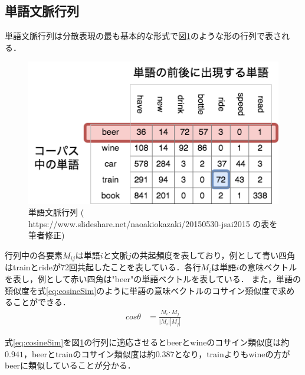 \subsection{単語文脈行列}
\label{rel:wordEmbed:WordParagraphMat}
単語文脈行列は分散表現の最も基本的な形式で図\ref{Fig:WordParagraphMat}のような形の行列で表される．
\begin{figure}[htbp]
 \begin{center}
  \includegraphics[width=\textwidth]{../images/2.Related_Work/WordParagraphMatrix2.png}
  \caption{単語文脈行列\newline
  ( https://www.slideshare.net/naoakiokazaki/20150530-jsai2015 の表を筆者修正)}
  \label{Fig:WordParagraphMat}
  \vspace{-10pt}
 \end{center}
\end{figure}

行列中の各要素$M_{ij}$は単語$i$と文脈$j$の共起頻度を表しており，例として青い四角はtrainとrideが72回共起したことを表している．各行$M_i$は単語$i$の意味ベクトルを表し，例として赤い四角は"beer"の単語ベクトルを表している．
また，単語の類似度を式\ref{eq:cosineSim}のように単語の意味ベクトルのコサイン類似度で求めることができる．
\begin{equation}
\begin{aligned}
\label{eq:cosineSim}
cos \theta & = \frac{M_i \cdot M_j}{ | M_i | | M_j |}
\end{aligned}
\end{equation}

式\ref{eq:cosineSim}を図\ref{Fig:WordParagraphMat}の行列に適応させるとbeerとwineのコサイン類似度は約$0.941$，beerとtrainのコサイン類似度は約$0.387$となり，trainよりもwineの方がbeerに類似していることが分かる．
